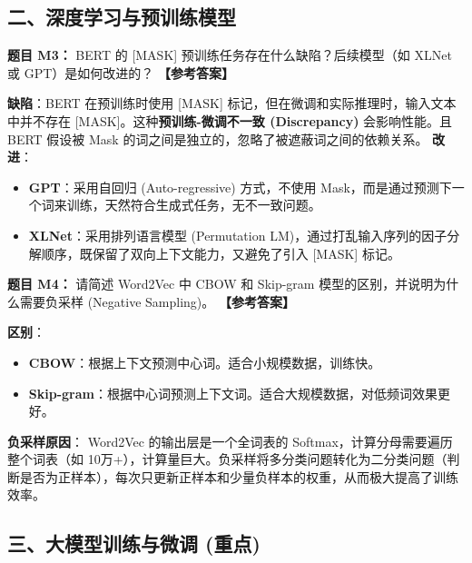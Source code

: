 \documentclass[a4paper,11pt]{article}
\newenvironment{question}[1]
    {\vspace{0.5cm}\noindent\textbf{题目 #1：}}
    {\vspace{0.2cm}}
\newenvironment{answer}
    {\noindent\textbf{【参考答案】}\par\small\color{blue}}
    {\par\vspace{0.5cm}\normalcolor}
\begin{document}
\subsection{二、深度学习与预训练模型}

\begin{question}{M3}
BERT 的 [MASK] 预训练任务存在什么缺陷？后续模型（如 XLNet 或 GPT）是如何改进的？
\end{question}
\begin{answer}
\textbf{缺陷}：BERT 在预训练时使用 [MASK] 标记，但在微调和实际推理时，输入文本中并不存在 [MASK]。这种\textbf{预训练-微调不一致 (Discrepancy)} 会影响性能。且 BERT 假设被 Mask 的词之间是独立的，忽略了被遮蔽词之间的依赖关系。
\textbf{改进}：
\begin{itemize}
    \item \textbf{GPT}：采用自回归 (Auto-regressive) 方式，不使用 Mask，而是通过预测下一个词来训练，天然符合生成式任务，无不一致问题。
    \item \textbf{XLNet}：采用排列语言模型 (Permutation LM)，通过打乱输入序列的因子分解顺序，既保留了双向上下文能力，又避免了引入 [MASK] 标记。
\end{itemize}
\end{answer}

\begin{question}{M4}
请简述 Word2Vec 中 CBOW 和 Skip-gram 模型的区别，并说明为什么需要负采样 (Negative Sampling)。
\end{question}
\begin{answer}
\textbf{区别}：
\begin{itemize}
    \item \textbf{CBOW}：根据上下文预测中心词。适合小规模数据，训练快。
    \item \textbf{Skip-gram}：根据中心词预测上下文词。适合大规模数据，对低频词效果更好。
\end{itemize}
\textbf{负采样原因}：
Word2Vec 的输出层是一个全词表的 Softmax，计算分母需要遍历整个词表（如 10万+），计算量巨大。负采样将多分类问题转化为二分类问题（判断是否为正样本），每次只更新正样本和少量负样本的权重，从而极大提高了训练效率。
\end{answer}

\subsection{三、大模型训练与微调 (重点)}
\end{document}

